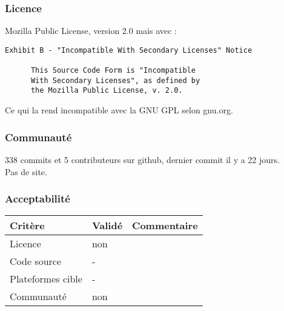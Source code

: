 \subsubsection{Licence}
Mozilla Public License, version 2.0 mais avec :
\begin{verbatim}
Exhibit B - "Incompatible With Secondary Licenses" Notice

      This Source Code Form is "Incompatible
      With Secondary Licenses", as defined by
      the Mozilla Public License, v. 2.0.
\end{verbatim}

Ce qui la rend incompatible avec la GNU GPL selon gnu.org\cite{ref2}.

\subsubsection{Communauté}
338 commits et 5 contributeurs sur github, dernier commit il y a 22 jours.\\

Pas de site.

\subsubsection{Acceptabilité}
\begin{tabular}{lll}
\toprule
	Critère				&	Validé		&	Commentaire	\\
\midrule
	Licence				&	non			&		\\
	Code source			&	-			&		\\
	Plateformes cible	&	-			&		\\
	Communauté			&	non			&		\\
\bottomrule
\end{tabular}

